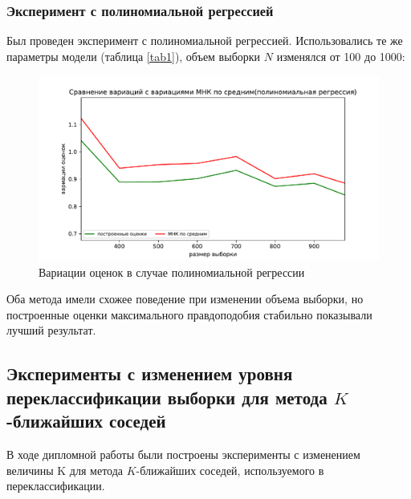 \subsubsection{Эксперимент с полиномиальной регрессией}
Был проведен эксперимент с полиномиальной регрессией. Использовались те же параметры модели (таблица \ref{tab1}), объем выборки $N$ изменялся от 100 до 1000:
\newpage
\begin{figure}[h!]
    \centering
    \includegraphics[width=150mm]{../images/polynomial.pdf}
    \caption{Вариации оценок в случае полиномиальной регрессии\label{overflow}}
    \label{pic3}
\end{figure}

Оба метода имели схожее поведение при изменении объема выборки, но построенные оценки максимального правдоподобия стабильно показывали лучший результат.

\subsection{Эксперименты с изменением уровня переклассификации выборки для метода $K$-ближайших соседей}\label{ss3_3_1}
В ходе дипломной работы были построены эксперименты с изменением величины K для метода $K$-ближайших соседей, используемого в переклассификации.  

